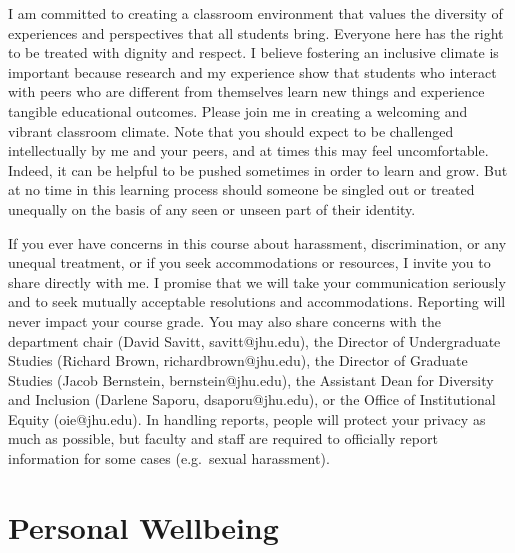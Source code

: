 \documentclass{amsart}
\theoremstyle{definition}
\theoremstyle{remark}
\numberwithin{equation}{section}
\begin{document}
I am committed to creating a classroom environment that values the diversity of experiences and perspectives that all students bring.  Everyone here has the right to be treated with dignity and respect.  I believe fostering an inclusive climate is important because research and my experience show that students who interact with peers who are different from themselves learn new things and experience tangible educational outcomes.  Please join me in creating a welcoming and vibrant classroom climate.  Note that you should expect to be challenged intellectually by me and your peers, and at times this may feel uncomfortable.  Indeed, it can be helpful to be pushed sometimes in order to learn and grow.  But at no time in this learning process should someone be singled out or treated unequally on the basis of any seen or unseen part of their identity.

If you ever have concerns in this course about harassment, discrimination, or any unequal treatment, or if you seek accommodations or resources, I invite you to share directly with me.  I promise that we will take your communication seriously and to seek mutually acceptable resolutions and accommodations.  Reporting will never impact your course grade.  You may also share concerns with the department chair (David Savitt, savitt@jhu.edu), the Director of Undergraduate Studies (Richard Brown, richardbrown@jhu.edu), the Director of Graduate Studies (Jacob Bernstein, bernstein@jhu.edu), the Assistant Dean for Diversity and Inclusion (Darlene Saporu, dsaporu@jhu.edu), or the Office of Institutional Equity (oie@jhu.edu).  In handling reports, people will protect your privacy as much as possible, but faculty and staff are required to officially report information for some cases (e.g.~sexual harassment).


\section*{Personal Wellbeing}
\end{document}
